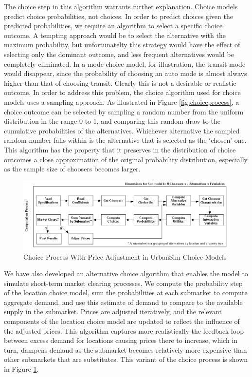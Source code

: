 The choice step in this algorithm warrants further explanation.  Choice models predict choice probabilities, not choices.
In order to predict choices given the predicted probabilities, we require an algorithm to select a specific choice outcome.
A tempting approach would be to select the alternative with the maximum probability, but unfortunatelty this strategy
would have the effect of selecting only the dominant outcome, and less frequent alternatives would be completely
eliminated.  In a mode choice model, for illustration, the transit mode would disappear, since the probability of choosing
an auto mode is almost always higher than that of choosing transit.  Clearly this is not a desirable or realistic outcome.
In order to address this problem, the choice algorithm used for choice models uses a sampling approach.  As illustrated in Figure
\ref{fig:choiceprocess}, a choice outcome can be selected by sampling a random number from the uniform distribution in the range
0 to 1, and comparing this random draw to the cumulative probabilities of the alternatives.  Whichever alternative the sampled
random number falls within is the alternative that is selected as the `chosen' one.  This algorithm has the property that it
preserves in the distribution of choice outcomes a close approximation of the original probability distribution, especially
as the sample size of choosers becomes larger.

\begin{figure}[htp]
\center
 \includegraphics[width=\textwidth]
 {graphics/ChoiceProcessWithPriceAdjustment.png}
\caption{Choice Process With Price Adjustment in UrbanSim Choice Models}
\label{fig:choiceprocesswithprice}
\end{figure}

We have also developed an alternative choice algorithm that enables the model to simulate short-term market clearing
processes.  We compute the probability step of the location choice model, sum the probabilities at each submarket to compute
aggregate demand, and use this estimate of demand to compare to the available supply in the submarket.  Prices are adjusted
iteratively, and the relevant components of the location choice model are updated to reflect the influence of the adjusted
prices.  This algorithm captures more realistically the feedback loop between excess demand for locations causing prices there
to increase, which in turn, dampens demand as the submarket becomes relatively more expensive than other submarkets that
are substitutes.  This variant of the choice process is shown in Figure \ref{fig:choiceprocesswithprice}.


